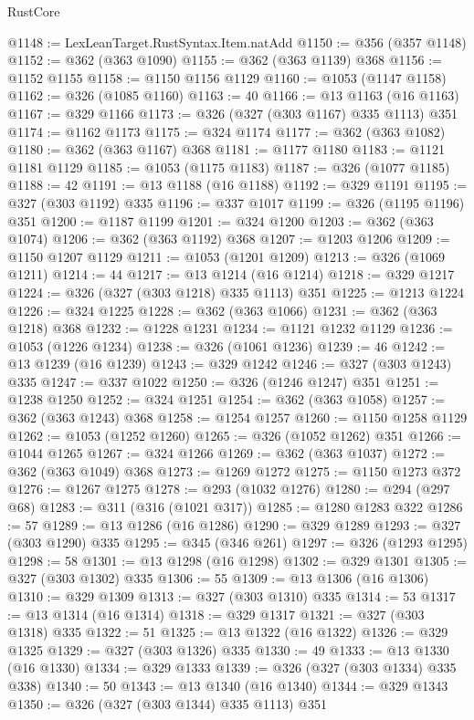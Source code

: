 \begin{lexlean}{RustCore}
\begin{coremodule}
@1148 := LexLeanTarget.RustSyntax.Item.natAdd
@1150 := @356 (@357 @1148)
@1152 := @362 (@363 @1090)
@1155 := @362 (@363 @1139) @368
@1156 := @1152 @1155
@1158 := @1150 @1156 @1129
@1160 := @1053 (@1147 @1158)
@1162 := @326 (@1085 @1160)
@1163 := 40
@1166 := @13 @1163 (@16 @1163)
@1167 := @329 @1166
@1173 := @326 (@327 (@303 @1167) @335 @1113) @351
@1174 := @1162 @1173
@1175 := @324 @1174
@1177 := @362 (@363 @1082)
@1180 := @362 (@363 @1167) @368
@1181 := @1177 @1180
@1183 := @1121 @1181 @1129
@1185 := @1053 (@1175 @1183)
@1187 := @326 (@1077 @1185)
@1188 := 42
@1191 := @13 @1188 (@16 @1188)
@1192 := @329 @1191
@1195 := @327 (@303 @1192) @335
@1196 := @337 @1017
@1199 := @326 (@1195 @1196) @351
@1200 := @1187 @1199
@1201 := @324 @1200
@1203 := @362 (@363 @1074)
@1206 := @362 (@363 @1192) @368
@1207 := @1203 @1206
@1209 := @1150 @1207 @1129
@1211 := @1053 (@1201 @1209)
@1213 := @326 (@1069 @1211)
@1214 := 44
@1217 := @13 @1214 (@16 @1214)
@1218 := @329 @1217
@1224 := @326 (@327 (@303 @1218) @335 @1113) @351
@1225 := @1213 @1224
@1226 := @324 @1225
@1228 := @362 (@363 @1066)
@1231 := @362 (@363 @1218) @368
@1232 := @1228 @1231
@1234 := @1121 @1232 @1129
@1236 := @1053 (@1226 @1234)
@1238 := @326 (@1061 @1236)
@1239 := 46
@1242 := @13 @1239 (@16 @1239)
@1243 := @329 @1242
@1246 := @327 (@303 @1243) @335
@1247 := @337 @1022
@1250 := @326 (@1246 @1247) @351
@1251 := @1238 @1250
@1252 := @324 @1251
@1254 := @362 (@363 @1058)
@1257 := @362 (@363 @1243) @368
@1258 := @1254 @1257
@1260 := @1150 @1258 @1129
@1262 := @1053 (@1252 @1260)
@1265 := @326 (@1052 @1262) @351
@1266 := @1044 @1265
@1267 := @324 @1266
@1269 := @362 (@363 @1037)
@1272 := @362 (@363 @1049) @368
@1273 := @1269 @1272
@1275 := @1150 @1273 @372
@1276 := @1267 @1275
@1278 := @293 (@1032 @1276)
@1280 := @294 (@297 @68)
@1283 := @311 (@316 (@1021 @317))
@1285 := @1280 @1283 @322
@1286 := 57
@1289 := @13 @1286 (@16 @1286)
@1290 := @329 @1289
@1293 := @327 (@303 @1290) @335
@1295 := @345 (@346 @261)
@1297 := @326 (@1293 @1295)
@1298 := 58
@1301 := @13 @1298 (@16 @1298)
@1302 := @329 @1301
@1305 := @327 (@303 @1302) @335
@1306 := 55
@1309 := @13 @1306 (@16 @1306)
@1310 := @329 @1309
@1313 := @327 (@303 @1310) @335
@1314 := 53
@1317 := @13 @1314 (@16 @1314)
@1318 := @329 @1317
@1321 := @327 (@303 @1318) @335
@1322 := 51
@1325 := @13 @1322 (@16 @1322)
@1326 := @329 @1325
@1329 := @327 (@303 @1326) @335
@1330 := 49
@1333 := @13 @1330 (@16 @1330)
@1334 := @329 @1333
@1339 := @326 (@327 (@303 @1334) @335 @338)
@1340 := 50
@1343 := @13 @1340 (@16 @1340)
@1344 := @329 @1343
@1350 := @326 (@327 (@303 @1344) @335 @1113) @351

\end{coremodule}
\end{lexlean}
